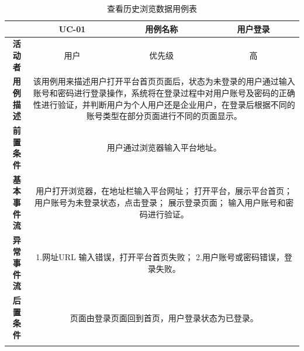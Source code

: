 \begin{longtable}[c]{c|ccc}
	\caption{查看历史浏览数据用例表}
	\label{tab:tab7}\\
	\shline
	\multicolumn{1}{c|}{\textbf{用例编号}} & \multicolumn{1}{c|}{UC-01} & \multicolumn{1}{c|}{用例名称} &  用户登录\\ \hline
	\endhead
	\multicolumn{1}{c|}{\textbf{活动者}} & \multicolumn{1}{c|}{用户} & \multicolumn{1}{c|}{优先级} &高  \\ \hline
	\textbf{用例描述} & \multicolumn{3}{p{12cm}}{该用例用来描述用户打开平台首页页面后，状态为未登录的用户通过输入账号和密码进行登录操作，系统将在登录过程中对用户账号及密码的正确性进行验证，并判断用户为个人用户还是企业用户，在登录后根据不同的账号类型在部分页面进行不同的页面显示。} \\ \hline
	\textbf{前置条件}& \multicolumn{3}{p{12cm}}{用户通过浏览器输入平台地址。} \\ \hline
	\textbf{基本事件流}& \multicolumn{3}{p{12cm}}{用户打开浏览器，在地址栏输入平台网址；\newline
		打开平台，展示平台首页；\newline
		用户账号为未登录状态，点击登录；\newline
		展示登录页面；\newline
		输入用户账号和密码进行验证。} \\ \hline
	\textbf{异常事件流}& \multicolumn{3}{p{12cm}}{1.网址URL 输入错误，打开平台首页失败；\newline
		2.用户账号或密码错误，登录失败。
	} \\ \hline
	\textbf{后置条件}& \multicolumn{3}{p{12cm}}{页面由登录页面回到首页，用户登录状态为已登录。} \\ \shline
\end{longtable}

